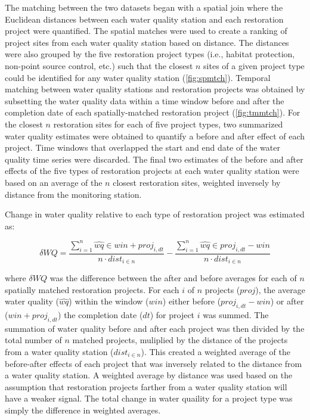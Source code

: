 \documentclass[]{article}
\begin{document}
The matching between the two datasets began with a spatial join where
the Euclidean distances between each water quality station and each
restoration project were quantified. The spatial matches were used to
create a ranking of project sites from each water quality station based
on distance. The distances were also grouped by the five restoration
project types (i.e., habitat protection, non-point source control, etc.)
such that the closest \(n\) sites of a given project type could be
identified for any water quality station (\cref{fig:spmtch}). Temporal
matching between water quality stations and restoration projects was
obtained by subsetting the water quality data within a time window
before and after the completion date of each spatially-matched
restoration project (\cref{fig:tmmtch}). For the closest \(n\)
restoration sites for each of five project types, two summarized water
quality estimates were obtained to quantify a before and after effect of
each project. Time windows that overlapped the start and end date of the
water quality time series were discarded. The final two estimates of the
before and after effects of the five types of restoration projects at
each water quality station were based on an average of the \(n\) closest
restoration sites, weighted inversely by distance from the monitoring
station.

Change in water quality relative to each type of restoration project was
estimated as:

\begin{equation}
\delta WQ = \frac{\sum_{i = 1}^{n} \hat{wq} \in win + proj_{i, dt}}{n \cdot dist_{i \in n}} - \frac{\sum_{i = 1}^{n} \hat{wq} \in proj_{i, dt} - win}{n \cdot dist_{i \in n}}
\label{eq:wqdif}
\end{equation}

where \(\delta WQ\) was the difference between the after and before
averages for each of \(n\) spatially matched restoration projects. For
each \(i\) of \(n\) projects (\(proj\)), the average water quality
(\(\hat{wq}\)) within the window (\(win\)) either before
(\(proj_{i, dt} - win\)) or after (\(win + proj_{i, dt}\)) the
completion date (\(dt\)) for project \(i\) was summed. The summation of
water quality before and after each project was then divided by the
total number of \(n\) matched projects, muliplied by the distance of the
projects from a water quality station (\(dist_{i \in n}\)). This created
a weighted average of the before-after effects of each project that was
inversely related to the distance from a water quality station. A
weighted average by distance was used based on the assumption that
restoration projects farther from a water quality station will have a
weaker signal. The total change in water quaility for a project type was
simply the difference in weighted averages.
\end{document}
